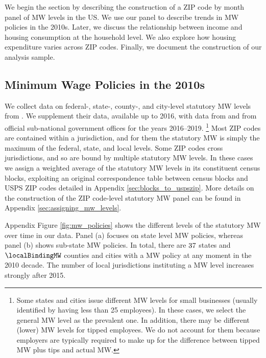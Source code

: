 
We begin the section by describing the construction of a ZIP code by month panel
of MW levels in the US. 
We use our panel to describe trends in MW policies in the 2010s.
Later, we discuss the relationship between income and housing consumption at the
household level.
We also explore how housing expenditure varies across ZIP codes.
Finally, we document the construction of our analysis sample.

\subsection{Minimum Wage Policies in the 2010s}

We collect data on federal-, state-, county-, and city-level statutory MW levels 
from \textcite{VaghulZipperer2016}.
We supplement their data, available up to 2016, with data from 
\textcite{BerkeleyLaborCenter} and from official sub-national government offices 
for the years 2016--2019.%
\footnote{Some states and cities issue different MW levels for small businesses
(usually identified by having less than 25 employees).
In these cases, we select the general MW level as the prevalent one.
In addition, there may be different (lower) MW levels for tipped employees.
We do not account for them because employers are typically required to make up 
for the difference between tipped MW plus tips and actual MW.}
%
%
Most ZIP codes are contained within a jurisdiction, and for them the statutory 
MW is simply the maximum of the federal, state, and local levels.
Some ZIP codes cross jurisdictions, and so are bound by multiple statutory MW 
levels.
In these cases we assign a weighted average of the statutory MW levels in its
constituent census blocks, exploiting an original correspondence table between 
census blocks and USPS ZIP codes detailed in 
Appendix \ref{sec:blocks_to_uspszip}.
More details on the construction of the ZIP code-level statutory MW panel 
can be found in Appendix \ref{sec:assigning_mw_levels}.

Appendix Figure \ref{fig:mw_policies} shows the different levels of the 
statutory MW over time in our data.
Panel (a) focuses on state level MW policies, whereas
panel (b) shows sub-state MW policies.
In total, there are $\textnormal{37}$ states and $\localBindingMW$ counties and 
cities with a MW policy at any moment in the 2010 decade.
The number of local jurisdictions instituting a MW level increases strongly
after 2015.

